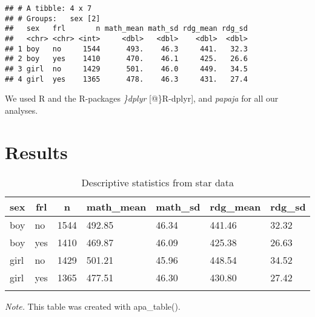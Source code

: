 \documentclass[
  english,
  man]{apa6}
\begin{document}
\begin{verbatim}
## # A tibble: 4 x 7
## # Groups:   sex [2]
##   sex   frl       n math_mean math_sd rdg_mean rdg_sd
##   <chr> <chr> <int>     <dbl>   <dbl>    <dbl>  <dbl>
## 1 boy   no     1544      493.    46.3     441.   32.3
## 2 boy   yes    1410      470.    46.1     425.   26.6
## 3 girl  no     1429      501.    46.0     449.   34.5
## 4 girl  yes    1365      478.    46.3     431.   27.4
\end{verbatim}

We used R \autocite[Version 3.6.2;][]{R-base} and the R-packages \emph{\}dplyr} {[}@\}R-dplyr{]}, and \emph{papaja} \autocite[Version 0.1.0.9997;][]{R-papaja} for all our analyses.

\hypertarget{results}{%
\section{Results}\label{results}}

\begin{table}[tbp]

\begin{center}
\begin{threeparttable}

\caption{\label{tab:apa_table}Descriptive statistics from star data}

\begin{tabular}{lllllll}
\toprule
sex & \multicolumn{1}{c}{frl} & \multicolumn{1}{c}{n} & \multicolumn{1}{c}{math\_mean} & \multicolumn{1}{c}{math\_sd} & \multicolumn{1}{c}{rdg\_mean} & \multicolumn{1}{c}{rdg\_sd}\\
\midrule
boy & no & 1544 & 492.85 & 46.34 & 441.46 & 32.32\\
boy & yes & 1410 & 469.87 & 46.09 & 425.38 & 26.63\\
girl & no & 1429 & 501.21 & 45.96 & 448.54 & 34.52\\
girl & yes & 1365 & 477.51 & 46.30 & 430.80 & 27.42\\
\bottomrule
\addlinespace
\end{tabular}

\begin{tablenotes}[para]
\normalsize{\textit{Note.} This table was created with apa\_table().}
\end{tablenotes}

\end{threeparttable}
\end{center}

\end{table}
\end{document}
